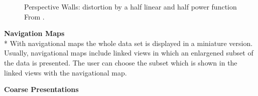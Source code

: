 \begin{figure}[H]
    \centering
    \caption{Perspective Walls: distortion by a half linear and half power function From \cite{Stroe1999}.}
    \label{fig:perspectivewall}
\end{figure}



\textbf{Navigation Maps}\\*
With navigational maps the whole data set is displayed in a miniature version. Usually, navigational maps include linked views in which an enlargened subset of the data is presented. The user can choose the subset which is shown in the linked views with the navigational map.

\textbf{Coarse Presentations}

